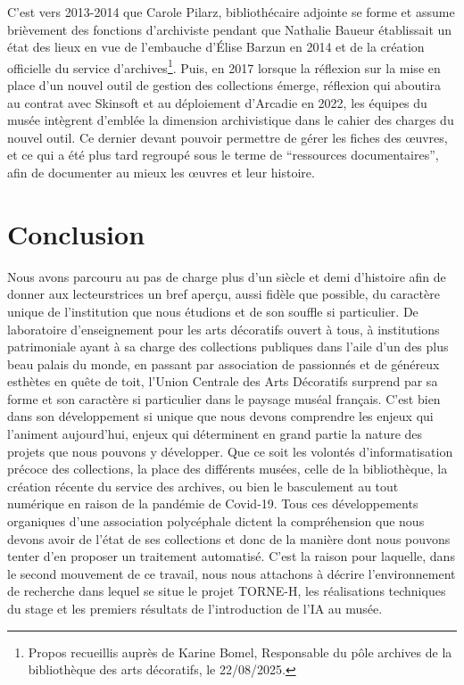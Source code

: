C'est vers 2013-2014 que Carole Pilarz, bibliothécaire adjointe se forme et assume brièvement des fonctions d'archiviste pendant que Nathalie Baueur établissait un état des lieux en vue de l'embauche d'Élise Barzun en 2014 et de la création officielle du service d'archives\footnote{Propos recueillis auprès de Karine Bomel, Responsable du pôle archives de la bibliothèque des arts décoratifs, le 22/08/2025.}. Puis, en 2017 lorsque la réflexion sur la mise en place d'un nouvel outil de gestion des collections émerge, réflexion qui aboutira au contrat avec Skinsoft et au déploiement d'Arcadie en 2022, les équipes du musée intègrent d'emblée la dimension archivistique dans le cahier des charges du nouvel outil. Ce dernier devant pouvoir permettre de gérer les fiches des œuvres, et ce qui a été plus tard regroupé sous le terme de \enquote{ressources documentaires}, afin de documenter au mieux les œuvres et leur histoire.

\chapter*{Conclusion}

Nous avons parcouru au pas de charge plus d'un siècle et demi d'histoire afin de donner aux lecteurs\wokisme trices un bref aperçu, aussi fidèle que possible, du caractère unique de l'institution que nous étudions et de son souffle si particulier. De laboratoire d'enseignement pour les arts décoratifs ouvert à tous, à institutions patrimoniale ayant à sa charge des collections publiques dans l'aile d'un des plus beau palais du monde, en passant par association de passionnés et de généreux esthètes en quête de toit, l'Union Centrale des Arts Décoratifs surprend par sa forme et son caractère si particulier dans le paysage muséal français. C'est bien dans son développement si unique que nous devons comprendre les enjeux qui l'animent aujourd'hui, enjeux qui déterminent en grand partie la nature des projets que nous pouvons y développer. Que ce soit les volontés d'informatisation précoce des collections, la place des différents musées, celle de la bibliothèque, la création récente du service des archives, ou bien le basculement au tout numérique en raison de la pandémie de Covid-19. Tous ces développements organiques d'une association polycéphale dictent la compréhension que nous devons avoir de l'état de ses collections et donc de la manière dont nous pouvons tenter d'en proposer un traitement automatisé. C'est la raison pour laquelle, dans le second mouvement de ce travail, nous nous attachons à décrire l'environnement de recherche dans lequel se situe le projet TORNE-H, les réalisations techniques du stage et les premiers résultats de l'introduction de l'IA au musée.